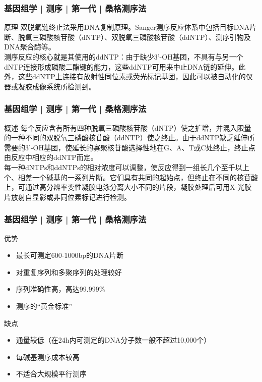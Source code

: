 \begin{frame}
  \frametitle{基因组学 | 测序 | 第一代 | 桑格测序法}
  \begin{block}{原理}
双脱氧链终止法采用DNA复制原理。Sanger测序反应体系中包括目标DNA片断、脱氧三磷酸核苷酸（dNTP）、双脱氧三磷酸核苷酸（ddNTP）、测序引物及DNA聚合酶等。\\
\vspace{1em}
测序反应的核心就是其使用的ddNTP：由于缺少3'-OH基团，不具有与另一个dNTP连接形成磷酸二酯键的能力，这些ddNTP可用来中止DNA链的延伸。此外，这些ddNTP上连接有放射性同位素或荧光标记基团，因此可以被自动化的仪器或凝胶成像系统所检测到。
  \end{block}
\end{frame}

\begin{frame}
  \frametitle{基因组学 | 测序 | 第一代 | 桑格测序法}
  \begin{block}{概述}
    每个反应含有所有四种脱氧三磷酸核苷酸（dNTP）使之扩增，并混入限量的一种不同的双脱氧三磷酸核苷酸（ddNTP）使之终止。由于ddNTP缺乏延伸所需要的3'-OH基团，使延长的寡聚核苷酸选择性地在G、A、T或C处终止，终止点由反应中相应的ddNTP而定。\\
\vspace{1em}
每一种dNTPs和ddNTPs的相对浓度可以调整，使反应得到一组长几个至千以上个、相差一个碱基的一系列片断。它们具有共同的起始点，但终止在不同的核苷酸上，可通过高分辨率变性凝胶电泳分离大小不同的片段，凝胶处理后可用X-光胶片放射自显影或非同位素标记进行检测。
  \end{block}
\end{frame}

\begin{frame}
  \frametitle{基因组学 | 测序 | 第一代 | 桑格测序法}
  \begin{block}{优势}
    \begin{itemize}
      \item 最长可测定600-1000bp的DNA片断
      \item 对重复序列和多聚序列的处理较好
      \item 序列准确性高，高达99.999\%
      \item 测序的“黄金标准”
    \end{itemize}
  \end{block}
  \pause
  \begin{block}{缺点}
    \begin{itemize}
      \item 通量较低（在24h内可测定的DNA分子数一般不超过10,000个）
      \item 每碱基测序成本较高
      \item 不适合大规模平行测序
    \end{itemize}
  \end{block}
\end{frame}

